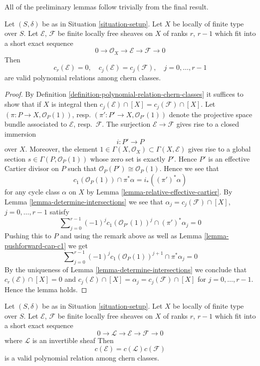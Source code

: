 \noindent
All of the preliminary lemmas follow trivially from the
final result.

\begin{lemma}
\label{lemma-get-rid-of-trivial-subbundle}
Let $(S, \delta)$ be as in Situation \ref{situation-setup}.
Let $X$ be locally of finite type over $S$.
Let $\mathcal{E}$, $\mathcal{F}$ be finite locally free sheaves
on $X$ of ranks $r$, $r - 1$ which fit into a short
exact sequence
$$
0 \to \mathcal{O}_X \to \mathcal{E} \to \mathcal{F} \to 0
$$
Then
$$
c_r(\mathcal{E}) = 0, \quad
c_j(\mathcal{E}) = c_j(\mathcal{F}), \quad j = 0, \ldots, r - 1
$$
are valid polynomial relations among chern classes.
\end{lemma}

\begin{proof}
By Definition \ref{definition-polynomial-relation-chern-classes}
it suffices to show that if $X$ is integral
then $c_j(\mathcal{E}) \cap [X] = c_j(\mathcal{F}) \cap [X]$.
Let $(\pi : P \to X, \mathcal{O}_P(1))$,
resp. $(\pi' : P' \to X, \mathcal{O}_{P'}(1))$ denote the
projective space bundle associated to $\mathcal{E}$, resp.\ $\mathcal{F}$.
The surjection $\mathcal{E} \to \mathcal{F}$ gives rise
to a closed immersion
$$
i : P' \longrightarrow P
$$
over $X$. Moreover, the element
$1 \in \Gamma(X, \mathcal{O}_X) \subset \Gamma(X, \mathcal{E})$
gives rise to a global section $s \in \Gamma(P, \mathcal{O}_P(1))$
whose zero set is exactly $P'$. Hence $P'$ is an effective Cartier
divisor on $P$ such that $\mathcal{O}_P(P') \cong \mathcal{O}_P(1)$.
Hence we see that
$$
c_1(\mathcal{O}_P(1)) \cap \pi^*\alpha = i_*((\pi')^*\alpha)
$$
for any cycle class $\alpha$ on $X$ by
Lemma \ref{lemma-relative-effective-cartier}.
By Lemma \ref{lemma-determine-intersections} we see that
$\alpha_j = c_j(\mathcal{F}) \cap [X]$, $j = 0, \ldots, r - 1$
satisfy
$$
\sum\nolimits_{j = 0}^{r - 1} (-1)^jc_1(\mathcal{O}_{P'}(1))^j
\cap (\pi')^*\alpha_j = 0
$$
Pushing this to $P$ and using the remark above as well as
Lemma \ref{lemma-pushforward-cap-c1} we get
$$
\sum\nolimits_{j = 0}^{r - 1}
(-1)^j c_1(\mathcal{O}_P(1))^{j + 1}
\cap \pi^*\alpha_j = 0
$$
By the uniqueness of Lemma \ref{lemma-determine-intersections}
we conclude that
$c_r(\mathcal{E}) \cap [X] = 0$ and
$c_j(\mathcal{E}) \cap [X] = \alpha_j = c_j(\mathcal{F}) \cap [X]$
for $j = 0, \ldots, r - 1$. Hence the lemma holds.
\end{proof}

\begin{lemma}
\label{lemma-additivity-invertible-subsheaf}
Let $(S, \delta)$ be as in Situation \ref{situation-setup}.
Let $X$ be locally of finite type over $S$.
Let $\mathcal{E}$, $\mathcal{F}$ be finite locally free sheaves
on $X$ of ranks $r$, $r - 1$ which fit into a short
exact sequence
$$
0 \to \mathcal{L} \to \mathcal{E} \to \mathcal{F} \to 0
$$
where $\mathcal{L}$ is an invertible sheaf
Then
$$
c(\mathcal{E}) = c(\mathcal{L}) c(\mathcal{F})
$$
is a valid polynomial relation among chern classes.
\end{lemma}

